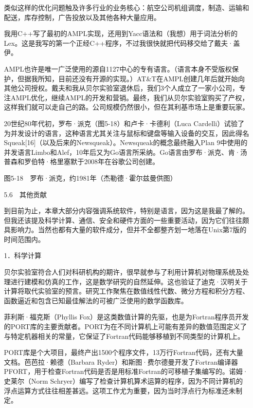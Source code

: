 \documentclass[a4paper,12pt,UTF8,twoside]{ctexbook}
\begin{document}
{{类似这样的优化问题触及许多行业的业务核心：航空公司机组调度，制造、运输和配送，库存控制，广告投放以及其他各种大量应用。

我用C++写了最初的AMPL实现，还用到Yacc语法和（我想）用于词法分析的Lex。这是我写的第一个正经C++程序，不过我很快就把代码移交给了戴夫·盖伊。

AMPL也许是唯一广泛使用的源自1127中心的专有语言。（语言本身不受版权保护，但据我所知，目前还没有开源的实现。）AT\&T在AMPL创建几年后就开始向其他公司授权。戴夫和我从贝尔实验室退休后，我们3个人成立了一家小公司，专注AMPL优化，继续AMPL的开发和营销。最终，我们从贝尔实验室购买了产权，这样我们就可以走自己的路。公司规模仍然很小，但在其利基市场上是重要玩家。

20世纪80年代初，罗布·派克（图5-18）和卢卡·卡德利（Luca Cardelli）试验了为并发设计的语言，这种语言尤其关注与鼠标和键盘等输入设备的交互，因此得名Squeak[16]（以及后来的Newsqueak）。Newsqueak的概念最终融入Plan 9中使用的并发语言Limbo和Alef，10年后又为Go语言所采纳。Go语言由罗布·派克、肯·汤普森和罗伯特·格里塞默于2008年在谷歌公司创建。



图5-18　罗布·派克，约1981年（杰勒德·霍尔兹曼供图）





5.6　其他贡献


到目前为止，本章大部分内容强调系统软件，特别是语言，因为这是我最了解的。但我还该提及科学计算、通信、安全和硬件方面的一些重要活动，因为它们往往颇具影响力。当然也都有大量的软件成分，但并不全都整齐划一地落在Unix第7版的时间范围内。





1．科学计算


贝尔实验室符合人们对科研机构的期许，很早就参与了利用计算机对物理系统及处理进行建模和仿真的工作，这是数学研究的自然延伸。这也验证了迪克·汉明关于计算将取代实验室的预言。研究工作聚焦在数值线性代数、微分方程和积分方程、函数逼近和包含已知最佳解法的可被广泛使用的数学函数库。

菲利斯·福克斯（Phyllis Fox）是这类数值计算的先驱，也是为Fortran程序员开发的PORT库的主要贡献者。PORT为在不同计算机上可能有差异的数值范围定义了与特定机器相关的常量，它保证了Fortran代码能够移植到不同类型的计算机上。

PORT库是个大项目，最终产出1500个程序文件，13万行Fortran代码，还有大量文档。芭芭拉·赖德（Barbara Ryder）和斯图·费尔德曼开发了Fortran编译器PFORT，用于检查Fortran代码是否是用标准Fortran的可移植子集编写的。诺姆·史莱尔（Norm Schryer）编写了检查计算机算术运算的程序，因为不同计算机的浮点运算方式往往相差甚远。这项工作尤为重要，因为当时浮点行为标准还未制定。

}}
\end{document}
